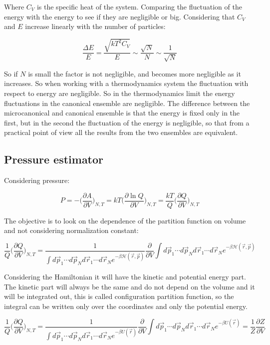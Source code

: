 		Where $C_V$ is the specific heat of the system.
		Comparing the fluctuation of the energy with the energy to see if they are negligible or big.
		Considering that $C_V$ and $E$ increase linearly with the number of particles:

		$$\frac{\Delta E}{E} = \frac{\sqrt{kT^2C_V}}{E}\sim\frac{\sqrt{N}}{N}\sim\frac{1}{\sqrt{N}}$$

		So if $N$ is small the factor is not negligible, and becomes more negligible as it increases.
		So when working with a thermodynamics system the fluctuation with respect to energy are negligible.
		So in the thermodynamics limit the energy fluctuations in the canonical ensemble are negligible.
		The difference between the microcanonical and canonical ensemble is that the energy is fixed only in the first, but in the second the fluctuation of the energy is negligible, so that from a practical point of view all the results from the two ensembles are equivalent.

	\subsection{Pressure estimator}
	Considering pressure:

	$$P = -\biggl(\frac{\partial A}{\partial V}\biggr)_{N, T} = kT\biggl(\frac{\partial \ln Q}{\partial V}\biggr)_{N, T} = \frac{kT}{Q}\biggl(\frac{\partial Q}{\partial V}\biggr)_{N, T}$$

	The objective is to look on the dependence of the partition function on volume and not considering normalization constant:

	$$\frac{1}{Q}\biggl(\frac{\partial Q}{\partial V}\biggr)_{N, T} = \frac{1}{\int d\vec{p}_1\cdots d\vec{p}_Nd\vec{r}_1\cdots d\vec{r}_Ne^{-\beta\mathcal{H}(\vec{r},\vec{p})}}\frac{\partial}{\partial V}\int d\vec{p}_1\cdots d\vec{p}_Nd\vec{r}_1\cdots d\vec{r}_N e^{-\beta\mathcal{H}(\vec{r},\vec{p})}$$

	Considering the Hamiltonian it will have the kinetic and potential energy part.
	The kinetic part will always be the same and do not depend on the volume and it will be integrated out, this is called configuration partition function, so the integral can be written only over the coordinates and only the potential energy.

	$$\frac{1}{Q}\biggl(\frac{\partial Q}{\partial V}\biggr)_{N, T} = \frac{1}{\int d\vec{p}_1\cdots d\vec{p}_Nd\vec{r}_1\cdots d\vec{r}_Ne^{-\beta U(\vec{r})}}\frac{\partial}{\partial V}\int d\vec{p}_1\cdots d\vec{p}_Nd\vec{r}_1\cdots d\vec{r}_N e^{-\beta U(\vec{r})} = \frac{1}{Z}\frac{\partial Z}{\partial V}$$

